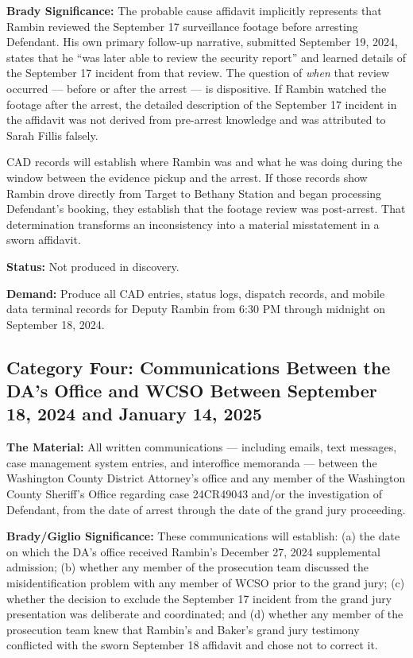 \documentclass[12pt,letterpaper]{extarticle}
\begin{document}
	\textbf{Brady Significance:} The probable cause affidavit implicitly represents
	that Rambin reviewed the September 17 surveillance footage before arresting
	Defendant. His own primary follow-up narrative, submitted September 19, 2024,
	states that he ``was later able to review the security report'' and learned details
	of the September 17 incident from that review. The question of \textit{when} that
	review occurred --- before or after the arrest --- is dispositive. If Rambin
	watched the footage after the arrest, the detailed description of the September 17
	incident in the affidavit was not derived from pre-arrest knowledge and was
	attributed to Sarah Fillis falsely.
	
	CAD records will establish where Rambin was and what he was doing during the
	window between the evidence pickup and the arrest. If those records show Rambin
	drove directly from Target to Bethany Station and began processing Defendant's
	booking, they establish that the footage review was post-arrest. That determination
	transforms an inconsistency into a material misstatement in a sworn affidavit.
	
	\textbf{Status:} Not produced in discovery.
	
	\textbf{Demand:} Produce all CAD entries, status logs, dispatch records, and
	mobile data terminal records for Deputy Rambin from 6:30 PM through midnight on
	September 18, 2024.
	
	\subsection{Category Four: Communications Between the DA's Office and WCSO
		Between September 18, 2024 and January 14, 2025}
	
	\textbf{The Material:} All written communications --- including emails, text
	messages, case management system entries, and interoffice memoranda --- between
	the Washington County District Attorney's office and any member of the Washington
	County Sheriff's Office regarding case 24CR49043 and/or the investigation of
	Defendant, from the date of arrest through the date of the grand jury proceeding.
	
	\textbf{Brady/Giglio Significance:} These communications will establish: (a) the
	date on which the DA's office received Rambin's December 27, 2024 supplemental
	admission; (b) whether any member of the prosecution team discussed the
	misidentification problem with any member of WCSO prior to the grand jury; (c)
	whether the decision to exclude the September 17 incident from the grand jury
	presentation was deliberate and coordinated; and (d) whether any member of the
	prosecution team knew that Rambin's and Baker's grand jury testimony conflicted
	with the sworn September 18 affidavit and chose not to correct it.
	
\end{document}
